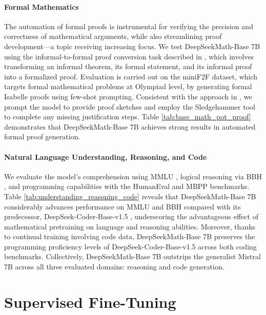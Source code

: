 \begin{itemize}[topsep=0pt]
\paragraph{Formal Mathematics}

The automation of formal proofs is instrumental for verifying the precision and correctness of mathematical arguments, while also streamlining proof development—a topic receiving increasing focus. We test DeepSeekMath-Base 7B using the informal-to-formal proof conversion task described in \citep{dsp_proof}, which involves transforming an informal theorem, its formal statement, and its informal proof into a formalized proof. Evaluation is carried out on the miniF2F \citep{minif2f} dataset, which targets formal mathematical problems at Olympiad level, by generating formal Isabelle proofs using few-shot prompting. Consistent with the approach in \cite{dsp_proof}, we prompt the model to provide proof sketches and employ the Sledgehammer tool \citep{sledgehammer} to complete any missing justification steps. Table \ref{tab:base_math_pot_proof} demonstrates that DeepSeekMath-Base 7B achieves strong results in automated formal proof generation.

\paragraph{Natural Language Understanding, Reasoning, and Code}

We evaluate the model’s comprehension using MMLU \citep{mmlu}, logical reasoning via BBH \citep{bbh}, and programming capabilities with the HumanEval \citep{codex} and MBPP \citep{mbpp} benchmarks. Table \ref{tab:understanding_reasoning_code} reveals that DeepSeekMath-Base 7B considerably advances performance on MMLU and BBH compared with its predecessor, DeepSeek-Coder-Base-v1.5 \citep{deepseek-coder}, underscoring the advantageous effect of mathematical pretraining on language and reasoning abilities. Moreover, thanks to continual training involving code data, DeepSeekMath-Base 7B preserves the programming proficiency levels of DeepSeek-Coder-Base-v1.5 across both coding benchmarks. Collectively, DeepSeekMath-Base 7B outstrips the generalist Mistral 7B \citep{mistral} across all three evaluated domains: reasoning and code generation.

\section{Supervised Fine-Tuning}


\end{itemize}
